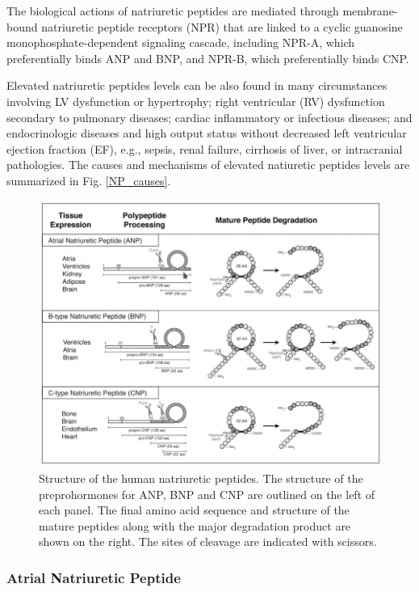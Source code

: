 \documentclass[14pt,a4paper,onecolumn]{extarticle}
\begin{document}
 The biological actions of natriuretic peptides are mediated through membrane-bound natriuretic peptide receptors (NPR) that are linked to a cyclic guanosine monophosphate-dependent signaling cascade, including NPR-A, which preferentially binds ANP and BNP, and NPR-B, which preferentially binds CNP.

Elevated natriuretic peptides levels can be also found in many circumstances involving LV dysfunction or hypertrophy; right ventricular (RV) dysfunction secondary to pulmonary diseases; cardiac inflammatory or infectious diseases; and endocrinologic diseases and high output status without decreased left ventricular ejection fraction (EF), e.g., sepsis, renal failure, cirrhosis of liver, or intracranial pathologies. The causes and mechanisms of elevated natiuretic peptides levels are summarized in Fig. \ref{NP_causes}. %

\begin{figure}
    \centering
    \includegraphics[scale=0.4]{../images/NP_structure.png}
    \caption{Structure of the human natriuretic peptides. The structure of the preprohormones for ANP, BNP and CNP are outlined on the left of each panel. The final amino acid sequence and structure of the mature peptides along with the major degradation product are shown on the right. The sites of cleavage are indicated with scissors.}
    \label{NP_structure}
\end{figure}

\subsubsection{Atrial Natriuretic Peptide}
\end{document}
